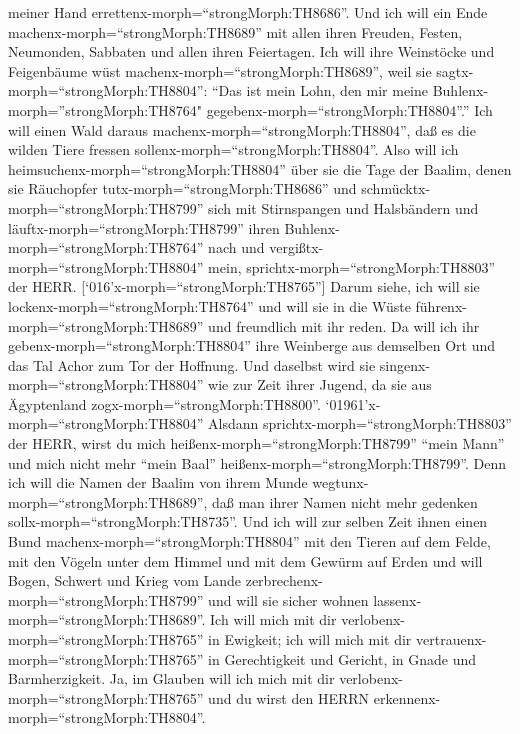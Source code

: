 meiner Hand errettenx-morph=``strongMorph:TH8686''.  Und
ich will ein Ende machenx-morph=``strongMorph:TH8689'' mit allen ihren
Freuden, Festen, Neumonden, Sabbaten und allen ihren Feiertagen.
 Ich will ihre Weinstöcke und Feigenbäume wüst
machenx-morph=``strongMorph:TH8689'', weil sie
sagtx-morph=``strongMorph:TH8804'': ``Das ist mein Lohn, den mir meine
Buhlenx-morph=''strongMorph:TH8764"
gegebenx-morph=``strongMorph:TH8804''.'' Ich will einen Wald daraus
machenx-morph=``strongMorph:TH8804'', daß es die wilden Tiere fressen
sollenx-morph=``strongMorph:TH8804''.  Also will ich
heimsuchenx-morph=``strongMorph:TH8804'' über sie die Tage der Baalim,
denen sie Räuchopfer tutx-morph=``strongMorph:TH8686'' und
schmücktx-morph=``strongMorph:TH8799'' sich mit Stirnspangen und
Halsbändern und läuftx-morph=``strongMorph:TH8799'' ihren
Buhlenx-morph=``strongMorph:TH8764'' nach und
vergißtx-morph=``strongMorph:TH8804'' mein,
sprichtx-morph=``strongMorph:TH8803'' der HERR. 
{[}`016'x-morph=``strongMorph:TH8765''{]} Darum siehe, ich will sie
lockenx-morph=``strongMorph:TH8764'' und will sie in die Wüste
führenx-morph=``strongMorph:TH8689'' und freundlich mit ihr reden.
 Da will ich ihr gebenx-morph=``strongMorph:TH8804'' ihre
Weinberge aus demselben Ort und das Tal Achor zum Tor der Hoffnung. Und
daselbst wird sie singenx-morph=``strongMorph:TH8804'' wie zur Zeit
ihrer Jugend, da sie aus Ägyptenland zogx-morph=``strongMorph:TH8800''.
 `01961'\textbar x-morph=``strongMorph:TH8804'' Alsdann
sprichtx-morph=``strongMorph:TH8803'' der HERR, wirst du mich
heißenx-morph=``strongMorph:TH8799'' ``mein Mann'' und mich nicht mehr
``mein Baal'' heißenx-morph=``strongMorph:TH8799''.  Denn
ich will die Namen der Baalim von ihrem Munde
wegtunx-morph=``strongMorph:TH8689'', daß man ihrer Namen nicht mehr
gedenken sollx-morph=``strongMorph:TH8735''.  Und ich will
zur selben Zeit ihnen einen Bund machenx-morph=``strongMorph:TH8804''
mit den Tieren auf dem Felde, mit den Vögeln unter dem Himmel und mit
dem Gewürm auf Erden und will Bogen, Schwert und Krieg vom Lande
zerbrechenx-morph=``strongMorph:TH8799'' und will sie sicher wohnen
lassenx-morph=``strongMorph:TH8689''.  Ich will mich mit
dir verlobenx-morph=``strongMorph:TH8765'' in Ewigkeit; ich will mich
mit dir vertrauenx-morph=``strongMorph:TH8765'' in Gerechtigkeit und
Gericht, in Gnade und Barmherzigkeit.  Ja, im Glauben will
ich mich mit dir verlobenx-morph=``strongMorph:TH8765'' und du wirst den
HERRN erkennenx-morph=``strongMorph:TH8804''. 
